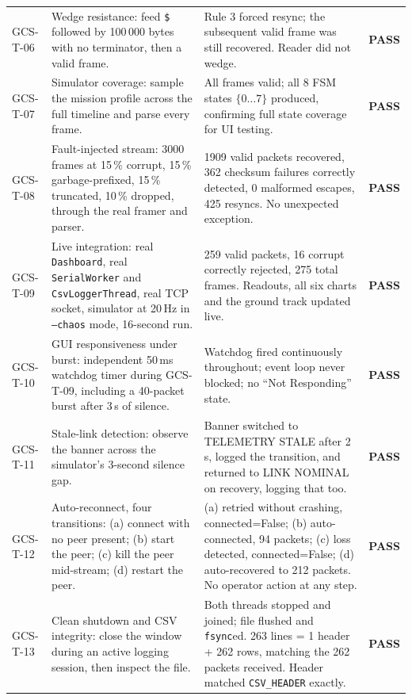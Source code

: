 \documentclass[11pt,a4paper]{article}
\newcommand{\code}[1]{\texttt{#1}}
\begin{document}
\begin{longtable}{@{}p{21mm}L{50mm}L{53mm}p{15mm}@{}}
GCS-T-06 & Wedge resistance: feed \code{\$} followed by 100\,000 bytes with no terminator, then a valid frame. & Rule 3 forced resync; the subsequent valid frame was still recovered. Reader did not wedge. & \textbf{PASS}\\

GCS-T-07 & Simulator coverage: sample the mission profile across the full timeline and parse every frame. & All frames valid; all 8 FSM states $\{0\ldots7\}$ produced, confirming full state coverage for UI testing. & \textbf{PASS}\\

GCS-T-08 & Fault-injected stream: 3000 frames at 15\,\% corrupt, 15\,\% garbage-prefixed, 15\,\% truncated, 10\,\% dropped, through the real framer and parser. & 1909 valid packets recovered, 362 checksum failures correctly detected, 0 malformed escapes, 425 resyncs. No unexpected exception. & \textbf{PASS}\\

GCS-T-09 & Live integration: real \code{Dashboard}, real \code{SerialWorker} and \code{CsvLoggerThread}, real TCP socket, simulator at 20\,Hz in \code{--chaos} mode, 16-second run. & 259 valid packets, 16 corrupt correctly rejected, 275 total frames. Readouts, all six charts and the ground track updated live. & \textbf{PASS}\\

GCS-T-10 & GUI responsiveness under burst: independent 50\,ms watchdog timer during GCS-T-09, including a 40-packet burst after 3\,s of silence. & Watchdog fired continuously throughout; event loop never blocked; no ``Not Responding'' state. & \textbf{PASS}\\

GCS-T-11 & Stale-link detection: observe the banner across the simulator's 3-second silence gap. & Banner switched to \textsf{TELEMETRY STALE} after 2\,s, logged the transition, and returned to \textsf{LINK NOMINAL} on recovery, logging that too. & \textbf{PASS}\\

GCS-T-12 & Auto-reconnect, four transitions: (a) connect with no peer present; (b) start the peer; (c) kill the peer mid-stream; (d) restart the peer. & (a) retried without crashing, connected=False; (b) auto-connected, 94 packets; (c) loss detected, connected=False; (d) auto-recovered to 212 packets. No operator action at any step. & \textbf{PASS}\\

GCS-T-13 & Clean shutdown and CSV integrity: close the window during an active logging session, then inspect the file. & Both threads stopped and joined; file flushed and \code{fsync}ed. 263 lines = 1 header + 262 rows, matching the 262 packets received. Header matched \code{CSV\_HEADER} exactly. & \textbf{PASS}\\


\end{longtable}
\end{document}
